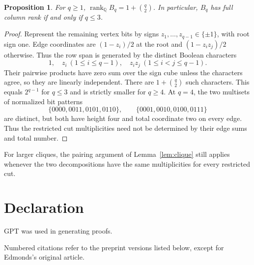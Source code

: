 \documentclass[10pt]{article}
\newtheorem{proposition}[theorem]{Proposition}
\theoremstyle{definition}
\theoremstyle{remark}
\begin{document}
\begin{proposition}\label{prop:rank}
For $q\geq1$, $\operatorname{rank}_{\mathbb Q}B_q=1+\binom q2$.
In particular, $B_q$ has full column rank if and only if $q\leq3$.
\end{proposition}
\begin{proof}
Represent the remaining vertex bits by signs $z_1,\ldots,z_{q-1}\in\{\pm1\}$, with root sign one.
Edge coordinates are $(1-z_i)/2$ at the root and $(1-z_i z_j)/2$ otherwise.
Thus the row span is generated by the distinct Boolean characters
\[
 1,\quad z_i\ (1\leq i\leq q-1),\quad z_i z_j\ (1\leq i<j\leq q-1).
\]
Their pairwise products have zero sum over the sign cube unless the characters agree, so they are linearly independent.
There are $1+\binom q2$ such characters.
This equals $2^{q-1}$ for $q\leq3$ and is strictly smaller for $q\geq4$.
At $q=4$, the two multisets of normalized bit patterns
\[
 \{0000,0011,0101,0110\},\qquad
 \{0001,0010,0100,0111\}
\]
are distinct, but both have height four and total coordinate two on every edge.
Thus the restricted cut multiplicities need not be determined by their edge sums and total number.
\end{proof}

For larger cliques, the pairing argument of Lemma~\ref{lem:clique} still applies whenever the two decompositions have the same multiplicities for every restricted cut.

\section*{Declaration}
GPT was used in generating proofs.

\medskip
\noindent Numbered citations refer to the preprint versions listed below, except for Edmonds's original article.

{\small


}
\end{document}
